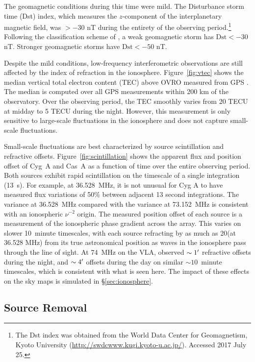 \begin{bibunit}
The geomagnetic conditions during this time were mild. The Disturbance storm time (Dst) index, which
measures the $z$-component of the interplanetary magnetic field, was
$>-30$ nT during the entirety of the observing period.\footnote{
    The Dst index was obtained from the World Data Center for Geomagnetism, Kyoto University
    (\url{http://swdcwww.kugi.kyoto-u.ac.jp/}). Accessed 2017 July 25.
}
Following the classification scheme of \citet{2008GMS...181.....K}, a weak geomagnetic storm has
$\text{Dst} < -30$ nT. Stronger geomagnetic storms have $\text{Dst} < -50$ nT.

Despite the mild conditions, low-frequency interferometric observations are still affected by the
index of refraction in the ionosphere.  Figure~\ref{fig:vtec} shows the median vertical total
electron content (TEC) above OVRO measured from GPS \citep{1999JASTP..61.1205I}. The median is
computed over all GPS measurements within 200 km of the observatory. Over the observing period, the
TEC smoothly varies from 20 TECU at midday to 5 TECU during the night. However, this measurement is
only sensitive to large-scale fluctuations in the ionosphere and does not capture small-scale
fluctuations.

Small-scale fluctuations are best characterized by source scintillation and refractive offsets.
Figure~\ref{fig:scintillation} shows the apparent flux and position offset of Cyg~A and Cas~A as a
function of time over the entire observing period. Both sources exhibit rapid scintillation on the
timescale of a single integration (13~s). For example, at 36.528~MHz, it is not unusual for
Cyg A to have measured flux variations of 50\% between adjacent 13 second integrations.  The
variance at 36.528~MHz compared with the variance at 73.152~MHz is consistent with an ionospheric
$\nu^{-2}$ origin. The measured position offset of each source is a measurement of the ionospheric
phase gradient across the array.  This varies on slower 10~minute timescales, with each source
refracting by as much as 20\arcmin (at 36.528 MHz) from its true astronomical position as waves
in the ionosphere pass through the line of sight. At 74~MHz on the VLA, \citet{2007ApJS..172..686K}
observed $\sim 1\mbox{$^\prime$}$ refractive offsets during the night, and $\sim 4\mbox{$^\prime$}$ offsets during the
day on similar $\sim10$~minute timescales, which is consistent with what is seen here.  The impact
of these effects on the sky maps is simulated in \S\ref{sec:ionosphere}.

\subsection{Source Removal}\label{sec:source-removal}


\end{bibunit}
